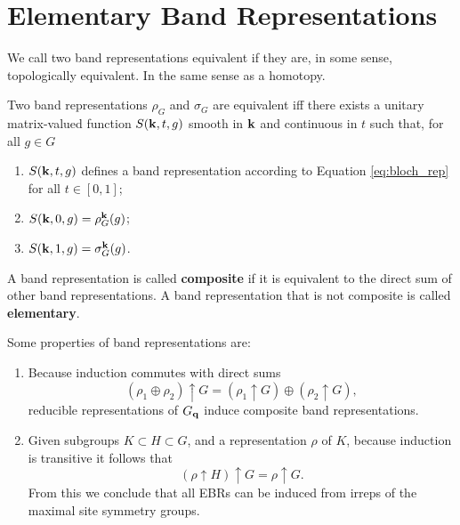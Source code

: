 \section{Elementary Band Representations}

We call two band representations equivalent if they are, in some sense, topologically equivalent. In the same sense as a homotopy.

\begin{definition} \label{def:equiv_bandrep}
Two band representations $\rho_G$ and $\sigma_G$ are equivalent iff there exists a unitary matrix-valued function $S({\vb{k}},t,g)$ smooth in ${\vb{k}}$ and continuous in $t$ such that, for all $g \in G$
\begin{enumerate}
\item $S({\vb{k}}, t, g)$ defines a band representation according to Equation \ref{eq:bloch_rep} for all $t \in [0,1]$;
\item $S({\vb{k}}, 0, g) = \rho_G^{\vb{k}}(g)$;
\item $S({\vb{k}}, 1, g) = \sigma_G^{\vb{k}}(g)$.
\end{enumerate}
\end{definition}

\begin{definition}
A band representation is called \textbf{composite} if it is equivalent to the direct sum of other band representations. A band representation that is not composite is called \textbf{elementary}.
\end{definition}

\begin{theorem}
Some properties of band representations are:
\begin{enumerate}
\item Because induction commutes with direct sums
$$
(\rho_1 \oplus \rho_2) \uparrow G = (\rho_1 \uparrow G) \oplus (\rho_2 \uparrow G),
$$
reducible representations of $G_{\vb{q}}$ induce composite band representations.

\item Given subgroups $K \subset H \subset G$, and a representation $\rho$ of $K$, because induction is transitive it follows that
$$
(\rho \uparrow H) \uparrow G = \rho \uparrow G.
$$
From this we conclude that all EBRs can be induced from irreps of the maximal site symmetry groups.
\end{enumerate}
\end{theorem}

